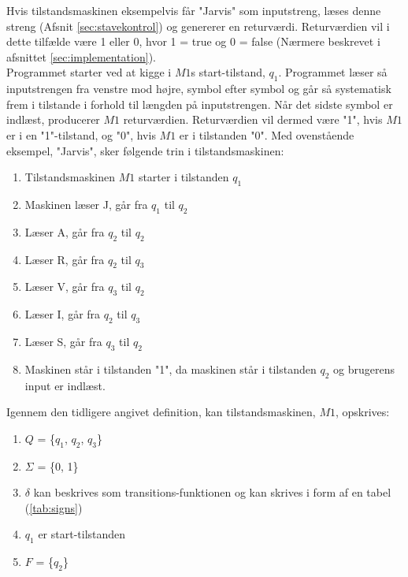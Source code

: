 Hvis tilstandsmaskinen eksempelvis får "Jarvis" som inputstreng, læses denne streng (Afsnit \ref{sec:stavekontrol}) og genererer en returværdi. Returværdien vil i dette tilfælde være 1 eller 0, hvor 1 = true og 0 = false (Nærmere beskrevet i afsnittet \ref{sec:implementation}). \\
Programmet starter ved at kigge i $M1$s start-tilstand, $q_1$. Programmet læser så inputstrengen fra venstre mod højre, symbol efter symbol og går så systematisk frem i tilstande i forhold til længden på inputstrengen. Når det sidste symbol er indlæst, producerer $M1$ returværdien. Returværdien vil dermed være "1", hvis $M1$ er i en "1"-tilstand, og "0", hvis $M1$ er i tilstanden "0". Med ovenstående eksempel, "Jarvis", sker følgende trin i tilstandsmaskinen:
\begin{enumerate}
    \item Tilstandsmaskinen $M1$ starter i tilstanden $q_1$
    \item Maskinen læser J, går fra $q_1$ til $q_2$
    \item Læser A, går fra $q_2$ til $q_2$
    \item Læser R, går fra $q_2$ til $q_3$
    \item Læser V, går fra $q_3$ til $q_2$ 
    \item Læser I, går fra $q_2$ til $q_3$
    \item Læser S, går fra $q_3$ til $q_2$
    \item Maskinen står i tilstanden "1", da maskinen står i tilstanden $q_2$ og brugerens input er indlæst.
\end{enumerate}

Igennem den tidligere angivet definition, kan tilstandsmaskinen, $M1$, opskrives:\\
\begin{enumerate}
    \item $Q$ = \{$q_1$, $q_2$, $q_3$\}
    \item $\Sigma$ = \{0, 1\}
    \item $\delta$ kan beskrives som transitions-funktionen og kan skrives i form af en tabel (\ref{tab:signs})
    \item $q_1$ er start-tilstanden
    \item $F$ = \{$q_2$\}
\end{enumerate}

